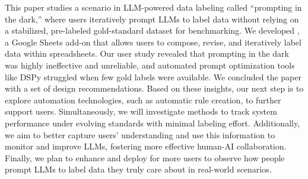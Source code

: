 This paper studies a scenario in LLM-powered data labeling called ``prompting in the dark,'' where users iteratively prompt LLMs to label data without relying on a stabilized, pre-labeled gold-standard dataset for benchmarking. 
We developed \system, a Google Sheets add-on that allows users to compose, revise, and iteratively label data within spreadsheets. 
Our user study revealed that prompting in the dark was highly ineffective and unreliable, and automated prompt optimization tools like DSPy struggled when few gold labels were available. 
We concluded the paper with a set of design recommendations. 
Based on these insights, our next step is to explore automation technologies, such as automatic rule creation, to further support users. %
Simultaneously, we will investigate methods to track system performance under evolving standards with minimal labeling effort. 
Additionally, we aim to better capture users' understanding and use this information to monitor and improve LLMs, fostering more effective human-AI collaboration. 
Finally, we plan to enhance and deploy \system for more users
to observe how people prompt LLMs to label data they truly care about in real-world scenarios.

